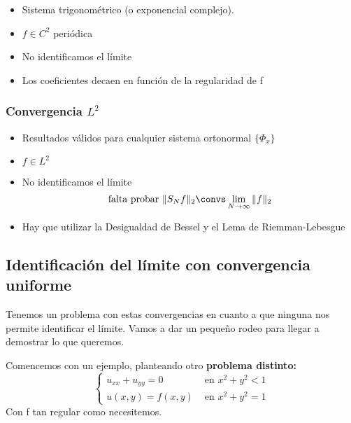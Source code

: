 			\begin{itemize}
				\item Sistema trigonométrico (o exponencial complejo).
				\item $f \in C^2$ periódica
				\item No identificamos el límite
				\item Los coeficientes decaen en función de la regularidad de f
			\end{itemize}

		\subsubsection*{Convergencia $L^2$}

			\begin{itemize}
				\item Resultados válidos para cualquier sistema ortonormal $\{ \Phi_x \}$
				\item $f \in L^2$
				\item No identificamos el límite
				\[\text{falta probar }\|S_N f\|_2 \convs \lim_{N \to \infty} \|f\|_2\]
				\item Hay que utilizar la Desigualdad de Bessel y el Lema de Riemman-Lebesgue

			\end{itemize}

		\subsection{Identificación del límite con convergencia uniforme}

		Tenemos un problema con estas convergencias en cuanto a que ninguna nos permite identificar el límite. Vamos a dar un pequeño rodeo para llegar a demostrar lo que queremos.

		Comencemos con un ejemplo, planteando otro \textbf{problema distinto:}
		\[
			\begin{cases}
				u_{xx} + u_{yy} = 0 & \text{ en } x^2 + y^2 < 1 \\
				u(x,y) = f(x,y) & \text{ en } x^2 + y^2 = 1
			\end{cases}
		\]
		Con f tan regular como necesitemos.


